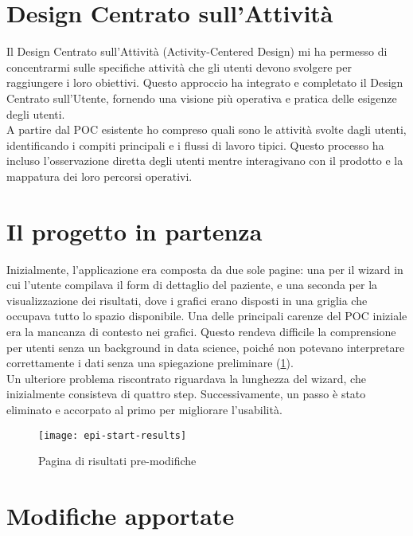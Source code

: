 \section{Design Centrato sull'Attività}

Il Design Centrato sull'Attività (Activity-Centered Design) mi ha permesso di concentrarmi sulle specifiche attività che gli utenti devono svolgere per raggiungere i loro obiettivi. Questo approccio ha integrato e completato il Design Centrato sull'Utente, fornendo una visione più operativa e pratica delle esigenze degli utenti.\\
A partire dal POC esistente ho compreso quali sono le attività svolte dagli utenti, identificando i compiti principali e i flussi di lavoro tipici. Questo processo ha incluso l'osservazione diretta degli utenti mentre interagivano con il prodotto e la mappatura dei loro percorsi operativi.\\



\section{Il progetto in partenza}
Inizialmente, l'applicazione era composta da due sole pagine: una per il wizard in cui l'utente compilava il form di dettaglio del paziente, e una seconda per la visualizzazione dei risultati, dove i grafici erano disposti in una griglia che occupava tutto lo spazio disponibile. Una delle principali carenze del POC iniziale era la mancanza di contesto nei grafici. Questo rendeva difficile la comprensione per utenti senza un background in data science, poiché non potevano interpretare correttamente i dati senza una spiegazione preliminare (\ref{fig:epi-start-results}).\\

Un ulteriore problema riscontrato riguardava la lunghezza del wizard, che inizialmente consisteva di quattro step. Successivamente, un passo è stato eliminato e accorpato al primo per migliorare l'usabilità.

\begin{figure}[!ht] 
    \centering 
    \texttt{[image: epi-start-results]} 
    \caption{Pagina di risultati pre-modifiche}
    \label{fig:epi-start-results}
\end{figure}

\section{Modifiche apportate}

